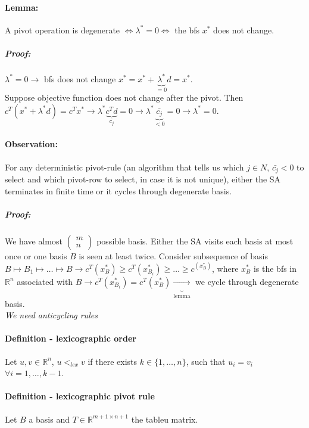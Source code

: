 \documentclass[main]{subfiles}
\begin{document}
\paragraph{Lemma:} A pivot operation is degenerate $\iff \lambda^* = 0 \iff$
the bfs $x^*$ does not change.

\subparagraph{Proof:}

$\lambda^* = 0 \rightarrow$ bfs does not change $x^* = x^* +
\underbrace{\lambda^*}_{=0} d = x^*$.\\
Suppose objective function does not change after the pivot. Then $c^T(x^* +
\lambda^* d) = c^T x^* \rightarrow \lambda^* \underbrace{c^T d}_{\bar{c_j}} = 0
\rightarrow \lambda^* \underbrace{\bar{c_j}}_{< 0} = 0 \rightarrow \lambda^* =
0$.

\paragraph{Observation:} For any deterministic pivot-rule (an algorithm that
tells us which $j \in N$, $\bar{c_j} < 0$ to select and which pivot-row to
select, in case it is not unique), either the SA terminates in finite time or
it cycles through degenerate basis.

\subparagraph{Proof:}
We have almost
$
\begin{pmatrix}
m \\
n
\end{pmatrix}$ possible basis. Either the SA visits each basis at most once or
one basis $B$ is seen at least twice. Consider subsequence of basis
$B \mapsto B_1 \mapsto \dots \mapsto B \rightarrow c^T(x^*_B) \geq 
c^T(x^*_{B_i}) \geq \dots \geq c^(x^*_B)$, where $x^*_B$ is the bfs in
$\mathbb{R}^n$ associated with $B \rightarrow c^T(x^*_{B_i}) = c^T(x^*_B)
\underbrace{\rightarrow}_{\text{lemma}}$ we cycle through degenerate basis.\\

\emph{We need anticycling rules}

\paragraph{Definition - lexicographic order}
Let $u, v \in \mathbb{R}^n$, $u <_{lex} v$ if there exists $k \in
\{1, \dots, n\}$, such that $u_i = v_i$ $\forall i = 1, \dots, k-1$.

\paragraph{Definition - lexicographic pivot rule}
Let $B$ a basis and $T \in \mathbb{R}^{m+1 \times n+1}$ the tableu matrix.
\end{document}
